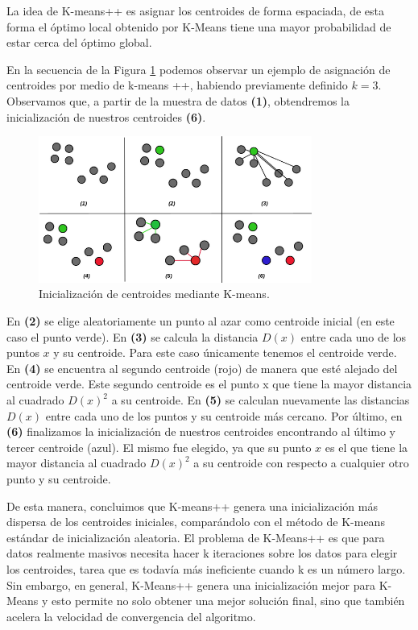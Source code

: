 \documentclass[12pt,a4paper]{article}
\begin{document}
\begin{sloppypar}
La idea de K-means++ es asignar los centroides de forma espaciada, de esta forma el óptimo local obtenido por K-Means tiene una mayor probabilidad de estar cerca del óptimo global.

\cleardoublepage
En la secuencia de la Figura \ref{fig:K_means_plus_plus} podemos observar un ejemplo de asignación de centroides por medio de k-means ++, habiendo previamente definido $k=3$. Observamos que, a partir de la muestra de datos \textbf{(1)}, obtendremos la inicialización de nuestros centroides \textbf{(6)}.\\

\begin{figure}[H]    %
 \centering
 \includegraphics[width=0.8\textwidth]{images/K_means_plus_plus.png}
 \captionsetup{justification=centering,margin=1cm}
 \caption{Inicialización de centroides mediante K-means.}
 \label{fig:K_means_plus_plus}
\end{figure} 

En \textbf{(2)} se elige aleatoriamente un punto al azar como centroide inicial (en este caso el punto verde).
En \textbf{(3)} se calcula la distancia $D(x)$ entre cada uno de los puntos $x$ y su centroide. Para este caso únicamente tenemos el centroide verde. 
En \textbf{(4)} se encuentra al segundo centroide (rojo) de manera que esté alejado del centroide verde. Este segundo centroide es el punto x que tiene la mayor distancia al cuadrado $D(x)^2$ a su centroide.
En \textbf{(5)} se calculan nuevamente las distancias $D(x)$ entre cada uno de los puntos y su centroide más cercano.
Por último, en \textbf{(6)} finalizamos la inicialización de nuestros centroides encontrando al último y tercer centroide (azul). El mismo fue elegido, ya que su punto $x$ es el que tiene la mayor distancia al cuadrado $D(x)^2$ a su centroide con respecto a cualquier otro punto y su centroide.

De esta manera, concluimos que K-means++ genera una inicialización más dispersa de los centroides iniciales, comparándolo con el método de K-means estándar de inicialización aleatoria. El problema de K-Means++ es que para datos realmente masivos necesita hacer k iteraciones sobre los datos para elegir los centroides, tarea que es todavía más ineficiente cuando k es un número largo. Sin embargo, en general, K-Means++ genera una inicialización mejor para K-Means y esto permite no solo obtener una mejor solución final, sino que también acelera la velocidad de convergencia del algoritmo.


\end{sloppypar}
\end{document}
